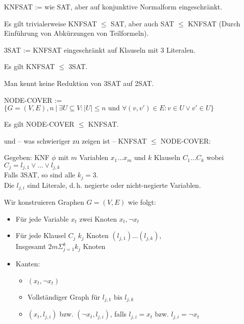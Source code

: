 \begin{beispiel}
    
    KNFSAT := wie SAT, aber auf konjunktive Normalform eingeschränkt.

    Es gilt trivialerweise KNFSAT $\leq$ SAT, aber auch SAT $\leq$ KNFSAT (Durch Einführung von Abkürzungen von Teilformeln).

\end{beispiel}

\begin{beispiel}
    
    3SAT := KNFSAT eingeschränkt auf Klauseln mit 3 Literalen.

    Es gilt KNFSAT $\leq$ 3SAT.

    Man kennt keine Reduktion von 3SAT auf 2SAT.

\end{beispiel}


\begin{beispiel}
    
    NODE-COVER := $\{ G = (V,E), n\ |\ \exists U \subseteq V: |U| \leq n \text{ und } \forall (v,v') \in E: v \in U \lor v' \in U \}$

    Es gilt NODE-COVER $\leq$ KNFSAT.

    und -- was schwieriger zu zeigen ist -- KNFSAT $\leq$ NODE-COVER:

    Gegeben: KNF $\phi$ mit $m$ Variablen $x_1 \dots x_m$ und $k$ Klauseln $C_1 \dots C_k$ wobei $C_j = l_{j,1} \lor \dots \lor l_{j,k}$\\
    Falls 3SAT, so sind alle $k_j = 3$.\\
    Die $l_{j,i}$ sind Literale, d.\,h. negierte oder nicht-negierte Variablen.

    Wir konstruieren Graphen $G = (V,E)$ wie folgt:
    \begin{itemize}
        \item Für jede Variable $x_t$ zwei Knoten $x_t, \neg x_t$
        \item Für jede Klausel $C_j$ $k_j$ Knoten $(l_{j,1}) \dots (l_{j,k})$,\\ Insgesamt $2m \Sigma_{j=1}^k k_j$ Knoten
        \item Kanten: 
        \begin{itemize}
            \item $(x_t, \neg x_t)$
            \item Vollständiger Graph für $l_{j,1} \text{ bis } l_{j,k}$
            \item $(x_t, l_{j,i})$ bzw. $(\neg x_t, l_{j,i})$, falls $l_{j,i} = x_t$ bzw. $l_{j,i} = \neg x_t$
        \end{itemize}
    \end{itemize}

\end{beispiel}





